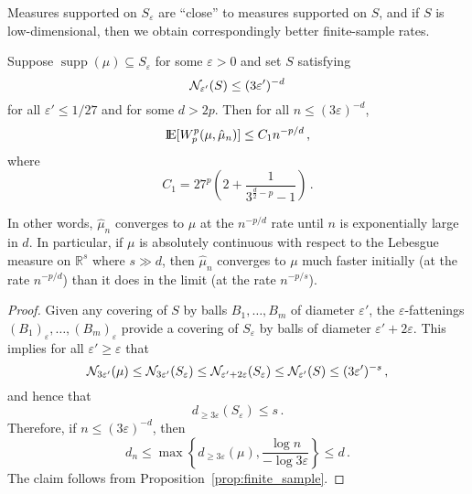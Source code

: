 \documentclass[sts]{imsart}
\newcommand{\RR}{\mathbb{R}}
\newcommand*{\ep}{\varepsilon}
\DeclareMathOperator{\supp}{supp}
\begin{document}
Measures supported on $S_\ep$ are ``close'' to measures supported on $S$, and if $S$ is low-dimensional, then we obtain correspondingly better finite-sample rates.

\begin{proposition}\label{prop:approx_low_dim}
Suppose $\supp(\mu) \subseteq S_\ep$ for some $\ep >0$ and set $S$ satisfying
\begin{equation*}
\cN_{\ep'}(S) \leq (3 \ep')^{-d}
\end{equation*}
for all $\ep' \leq 1/27$ and for some $d > 2p$.
Then for all $n \leq (3\ep)^{-d}$,
\begin{equation*}
{\rm I}\kern-0.18em{\rm E}[W_p^p(\mu, \hat \mu_n)] \leq C_1 n^{-p/d}\,,
\end{equation*}
where
\begin{equation*}
C_1 = 27^p\left(2+\frac{1}{3^{\frac{d}{2} - p} -1}\right)\,.
\end{equation*}
\end{proposition}
In other words, $\hat \mu_n$ converges to $\mu$ at the $n^{-p/d}$ rate until $n$ is exponentially large in $d$.
In particular, if $\mu$ is absolutely continuous with respect to the Lebesgue measure on $\RR^{s}$ where $s \gg d$, then $\hat \mu_n$ converges to $\mu$ much faster initially (at the rate $n^{-p/d}$) than it does in the limit (at the rate $n^{-p/s}$).

\begin{proof}
Given any covering of $S$ by balls $B_1, \dots, B_m$ of diameter $\ep'$, the $\ep$-fattenings $(B_1)_\ep, \dots, (B_m)_\ep$ provide a covering of $S_\ep$ by balls of diameter $\ep' + 2 \ep$.
This implies for all $\ep' \geq \ep$ that
\begin{equation*}
\cN_{3 \ep'}(\mu) \leq \cN_{3 \ep'}(S_\ep) \leq \cN_{\ep' + 2 \ep}(S_\ep) \leq \cN_{\ep'}(S) \leq (3 \ep')^{-s}\,,
\end{equation*}
and hence that
\begin{equation*}
d_{\geq 3 \ep}(S_\ep) \leq s\,.
\end{equation*}
Therefore, if $n \leq (3 \ep)^{-d}$, then
\begin{equation*}
d_n \leq \max\left\{d_{\geq 3 \ep}(\mu), \frac{\log n}{- \log 3 \ep}\right\} \leq d\,.
\end{equation*}
The claim follows from Proposition~\ref{prop:finite_sample}.
\end{proof}
\end{document}
